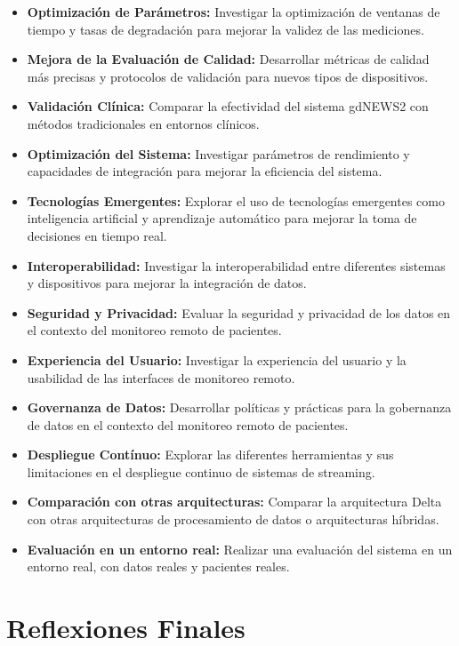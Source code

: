 \begin{itemize}
    \item \textbf{Optimización de Parámetros:} Investigar la optimización de ventanas de tiempo y tasas de degradación para mejorar la validez de las mediciones.
    \item \textbf{Mejora de la Evaluación de Calidad:} Desarrollar métricas de calidad más precisas y protocolos de validación para nuevos tipos de dispositivos.
    \item \textbf{Validación Clínica:} Comparar la efectividad del sistema gdNEWS2 con métodos tradicionales en entornos clínicos.
    \item \textbf{Optimización del Sistema:} Investigar parámetros de rendimiento y capacidades de integración para mejorar la eficiencia del sistema.
    \item \textbf{Tecnologías Emergentes:} Explorar el uso de tecnologías emergentes como inteligencia artificial y aprendizaje automático para mejorar la toma de decisiones en tiempo real.
    \item \textbf{Interoperabilidad:} Investigar la interoperabilidad entre diferentes sistemas y dispositivos para mejorar la integración de datos.
    \item \textbf{Seguridad y Privacidad:} Evaluar la seguridad y privacidad de los datos en el contexto del monitoreo remoto de pacientes.
    \item \textbf{Experiencia del Usuario:} Investigar la experiencia del usuario y la usabilidad de las interfaces de monitoreo remoto.
    \item \textbf{Governanza de Datos:} Desarrollar políticas y prácticas para la gobernanza de datos en el contexto del monitoreo remoto de pacientes.
    \item \textbf{Despliegue Contínuo: } Explorar las diferentes herramientas y sus limitaciones en el despliegue continuo de sistemas de streaming.
    \item \textbf{Comparación con otras arquitecturas:} Comparar la arquitectura Delta con otras arquitecturas de procesamiento de datos o arquitecturas híbridas.
    \item \textbf{Evaluación en un entorno real:} Realizar una evaluación del sistema en un entorno real, con datos reales y pacientes reales.
\end{itemize}
\newpage
\section{Reflexiones Finales}

